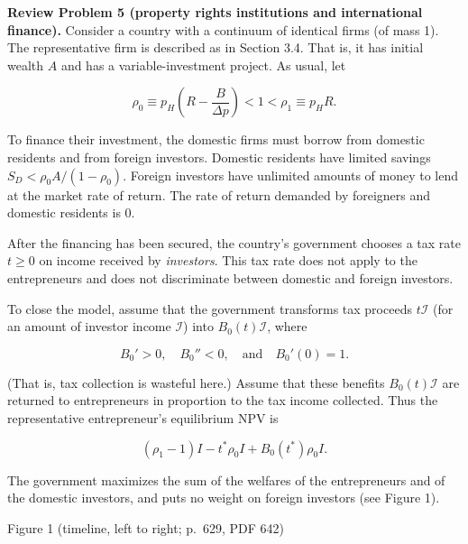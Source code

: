 \documentclass[11pt,a4paper]{article}
\begin{document}
\textbf{Review Problem 5 (property rights institutions and international finance).} Consider a
country with a continuum of identical firms (of mass 1). The representative firm is described as in
Section 3.4. That is, it has initial wealth \(A\) and has a variable-investment project. As usual,
let

\[\rho_0 \equiv p_H\left(R - \frac{B}{\Delta p}\right) < 1 < \rho_1 \equiv p_H R.\]

To finance their investment, the domestic firms must borrow from domestic residents and from foreign
investors. Domestic residents have limited savings \(S_D < \rho_0 A/(1 - \rho_0)\). Foreign
investors have unlimited amounts of money to lend at the market rate of return. The rate of return
demanded by foreigners and domestic residents is 0.

After the financing has been secured, the country's government chooses a tax rate \(t \geqslant 0\)
on income received by \emph{investors}. This tax rate does not apply to the entrepreneurs and does
not discriminate between domestic and foreign investors.

To close the model, assume that the government transforms tax proceeds \(t\mathcal{I}\) (for an
amount of investor income \(\mathcal{I}\)) into \(B_0(t)\mathcal{I}\), where

\[B_0' > 0, \quad B_0'' < 0, \quad\text{and}\quad B_0'(0) = 1.\]

(That is, tax collection is wasteful here.) Assume that these benefits \(B_0(t)\mathcal{I}\) are
returned to entrepreneurs in proportion to the tax income collected. Thus the representative
entrepreneur's equilibrium NPV is

\[(\rho_1 - 1)I - t^*\rho_0 I + B_0(t^*)\rho_0 I.\]

The government maximizes the sum of the welfares of the entrepreneurs and of the domestic investors,
and puts no weight on foreign investors (see Figure 1).

Figure 1 (timeline, left to right; p.~629, PDF 642)
\end{document}
